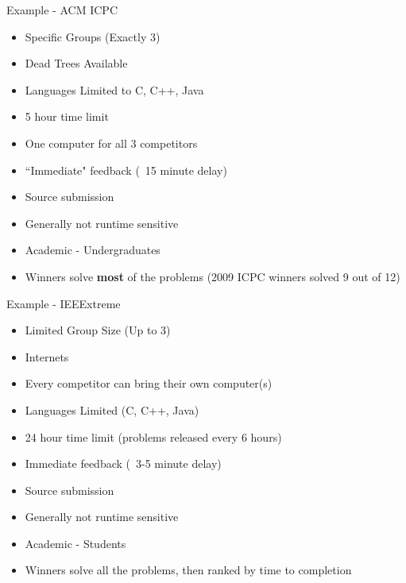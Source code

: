 \documentclass{beamer}
\begin{document}
\begin{frame}{Example - ACM ICPC}
  \begin{centering}
    \begin{itemize}
      \item Specific Groups (Exactly 3)
      \item Dead Trees Available
      \item Languages Limited to C, C++, Java
      \item 5 hour time limit
      \item One computer for all 3 competitors
      \item ``Immediate" feedback (~15 minute delay)
      \item Source submission
      \item Generally not runtime sensitive
      \item Academic - Undergraduates
      \item Winners solve \textbf{most} of the problems (2009 ICPC winners solved 9 out of 12)
    \end{itemize}
  \end{centering}
\end{frame}

\begin{frame}{Example - IEEExtreme}
  \begin{centering}
    \begin{itemize}
      \item Limited Group Size (Up to 3)
      \item Internets
      \item Every competitor can bring their own computer(s)
      \item Languages Limited (C, C++, Java)
      \item 24 hour time limit (problems released every 6 hours)
      \item Immediate feedback (~3-5 minute delay)
      \item Source submission
      \item Generally not runtime sensitive
      \item Academic - Students
      \item Winners solve all the problems, then ranked by time to completion
    \end{itemize}
  \end{centering}
\end{frame}
\end{document}
